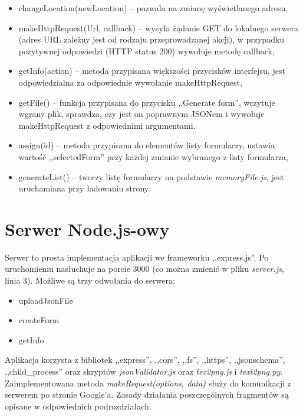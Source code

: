 \begin{itemize}
\item changeLocation(newLocation) -- pozwala na zmianę wyświetlanego adresu,
\item makeHttpRequest(Url, callback) -- wysyła żądanie GET do lokalnego serwera (adres URL zależny jest od rodzaju przeprowadzanej akcji), w przypadku pozytywnej odpowiedzi (HTTP status 200) wywołuje metodę callback,
\item getInfo(action) -- metoda przypisana większości przycisków interfejsu, jest odpowiedzialna za odpowiednie wywołanie makeHttpRequest,
\item getFile() -- funkcja przypisana do przycisku ,,Generate form'', wczytuje wgrany plik, sprawdza, czy jest on poprawnym JSONem i wywołuje makeHttpRequest z odpowiednimi argumentami.
\item assign(id) -- metoda przypisana do elementów listy formularzy, ustawia wartość ,,selectedForm'' przy każdej zmianie wybranego z listy formularza,
\item generateList() -- tworzy listę formularzy na podstawie \textit{memoryFile.js}, jest uruchamiana przy ładowaniu strony.
\end{itemize}


\section{Serwer Node.js-owy}
Serwer to prosta implementacja aplikacji we frameworku ,,express.js''. Po uruchomieniu nasłuchuje na porcie 3000 (co można zmienić w pliku \textit{server.js}, linia 3). Możliwe są trzy odwołania do serwera:
\begin{itemize}
\item uploadJsonFile
\item createForm
\item getInfo
\end{itemize}
Aplikacja korzysta z bibliotek ,,express'', ,,cors'', ,,fs'', ,,https'', ,,jsonschema'', ,,child\_process''  oraz skryptów \textit{jsonValidator.js} oraz \textit{tex2png.js} i \textit{text2png.py}.
Zaimplementowana metoda \textit{makeRequest(options, data)} służy do komunikacji z serwerem po stronie Google'a.
\ind Zasady działania poszczególnych fragmentów są opisane w odpowiednich podrozdziałach.
